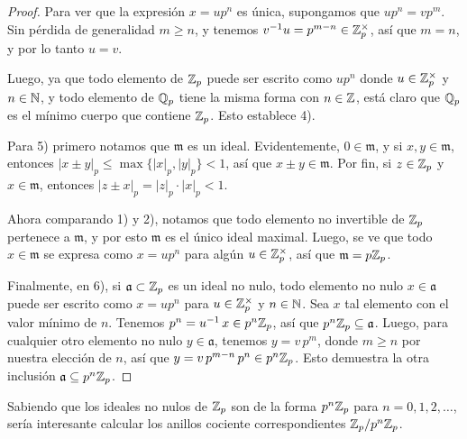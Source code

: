 \documentclass{article}
\numberwithin{equation}{section}
\theoremstyle{definition}
\begin{document}
\begin{teorema}
\begin{proof}
    Para ver que la expresión $x = up^n$ es única, supongamos que
    $up^n = vp^m$. Sin pérdida de generalidad $m\ge n$, y tenemos
    $v^{-1} u = p^{m-n} \in \mathbb{Z}_p^\times$, así que $m = n$, y por lo tanto
    $u = v$.

    \vspace{1em}

    Luego, ya que todo elemento de $\mathbb{Z}_p$ puede ser escrito como $up^n$ donde
    $u\in\mathbb{Z}_p^\times$ y $n\in\mathbb{N}$, y todo elemento de $\mathbb{Q}_p$ tiene la misma
    forma con $n\in\mathbb{Z}$, está claro que $\mathbb{Q}_p$ es el mínimo cuerpo que contiene
    $\mathbb{Z}_p$. Esto establece 4).

    \vspace{1em}

    Para 5) primero notamos que $\mathfrak{m}$ es un ideal. Evidentemente,
    $0\in\mathfrak{m}$, y si $x,y\in\mathfrak{m}$, entonces
    $|x\pm y|_p \le \max \{ |x|_p, |y|_p \} < 1$, así que
    $x\pm y \in \mathfrak{m}$. Por fin, si $z\in\mathbb{Z}_p$ y $x\in\mathfrak{m}$,
    entonces $|z\pm x|_p = |z|_p\cdot |x|_p < 1$.

    Ahora comparando 1) y 2), notamos que todo elemento no invertible de $\mathbb{Z}_p$
    pertenece a $\mathfrak{m}$, y por esto $\mathfrak{m}$ es el único ideal
    maximal. Luego, se ve que todo $x \in \mathfrak{m}$ se expresa como
    $x = up^n$ para algún $u \in \mathbb{Z}_p^\times$, así que $\mathfrak{m} = p\mathbb{Z}_p$.

    \vspace{1em}

    Finalmente, en 6), si $\mathfrak{a} \subset \mathbb{Z}_p$ es un ideal no nulo, todo
    elemento no nulo $x\in \mathfrak{a}$ puede ser escrito como $x = up^n$ para
    $u \in \mathbb{Z}_p^\times$ y $n\in \mathbb{N}$. Sea $x$ tal elemento con el valor mínimo
    de $n$. Tenemos $p^n = u^{-1}\,x \in p^n\mathbb{Z}_p$, así que
    $p^n\mathbb{Z}_p \subseteq \mathfrak{a}$. Luego, para cualquier otro elemento no
    nulo $y \in \mathfrak{a}$, tenemos $y = v\,p^m$, donde $m \ge n$ por nuestra
    elección de $n$, así que $y = v\,p^{m-n}\,p^n \in p^n\mathbb{Z}_p$. Esto demuestra
    la otra inclusión $\mathfrak{a} \subseteq p^n\mathbb{Z}_p$.
  \end{proof}
\end{teorema}

Sabiendo que los ideales no nulos de $\mathbb{Z}_p$ son de la forma $p^n\mathbb{Z}_p$ para
$n = 0,1,2,\ldots$, sería interesante calcular los anillos cociente
correspondientes $\mathbb{Z}_p/p^n\mathbb{Z}_p$.
\end{document}
